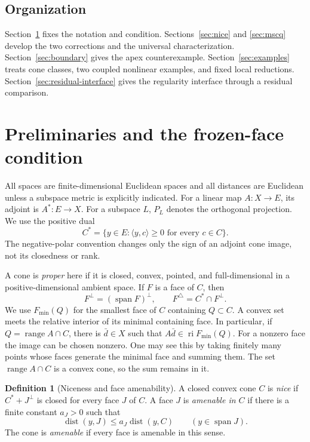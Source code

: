 \documentclass[11pt]{article}
\numberwithin{equation}{section}
\theoremstyle{definition}
\newtheorem{definition}[theorem]{Definition}
\theoremstyle{remark}
\DeclareMathOperator{\dist}{dist}
\DeclareMathOperator{\ri}{ri}
\DeclareMathOperator{\spann}{span}
\DeclareMathOperator{\range}{range}
\newcommand{\ip}[2]{\langle #1,#2\rangle}
\newcommand{\dset}[2]{\dist(#1,#2)}
\begin{document}
\subsection{Organization}

Section~\ref{sec:preliminaries} fixes the notation and condition.
Sections~\ref{sec:nice} and \ref{sec:mscq} develop the two corrections
and the universal characterization. Section~\ref{sec:boundary} gives
the apex counterexample. Section~\ref{sec:examples} treats cone classes,
two coupled nonlinear examples, and fixed local reductions.
Section~\ref{sec:residual-interface} gives the regularity interface
through a residual comparison.

\section{Preliminaries and the frozen-face condition}
\label{sec:preliminaries}

All spaces are finite-dimensional Euclidean spaces and all distances are
Euclidean unless a subspace metric is explicitly indicated. For a linear
map $A:X\to E$, its adjoint is $A^*:E\to X$. For a subspace $L$, $P_L$
denotes the orthogonal projection. We use the positive dual
\[
 C^*=\{y\in E:\ip{y}{c}\geq0\text{ for every }c\in C\}.
\]
The negative-polar convention changes only the sign of an adjoint cone
image, not its closedness or rank.

A cone is \emph{proper} here if it is closed, convex, pointed, and
full-dimensional in a positive-dimensional ambient space. If $F$ is a
face of $C$, then
\[
 F^\perp=(\spann F)^\perp,
 \qquad F^\triangle=C^*\cap F^\perp.
\]
We use $F_{\min}(Q)$ for the smallest face of $C$ containing $Q\subset C$.
A convex set meets the relative interior of its minimal containing face.
In particular, if $Q=\range A\cap C$, there is $\bar d\in X$ such that
$A\bar d\in\ri F_{\min}(Q)$. For a nonzero face the image can be chosen
nonzero. One may see this by taking finitely many points whose faces
generate the minimal face and summing them. The set $\range A\cap C$ is
a convex cone, so the sum remains in it.

\begin{definition}[Niceness and face amenability]
\label{def:amenable}
A closed convex cone $C$ is \emph{nice} if $C^*+J^\perp$ is closed for
every face $J$ of $C$. A face $J$ is \emph{amenable in $C$} if there is a
finite constant $a_J>0$ such that
\begin{equation}
 \dset{y}{J}\leq a_J\dset{y}{C}
 \qquad (y\in\spann J).
 \label{eq:amenable}
\end{equation}
The cone is \emph{amenable} if every face is amenable in this sense.
\end{definition}
\end{document}
